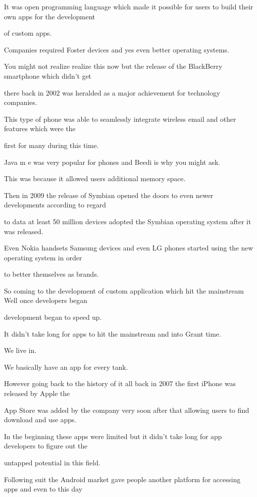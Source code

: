 It was open programming language which made it possible for users to build their own apps for the development

of custom apps.

Companies required Foster devices and yes even better operating systems.

You might not realize realize this now but the release of the BlackBerry smartphone which didn't get

there back in 2002 was heralded as a major achievement for technology companies.

This type of phone was able to seamlessly integrate wireless email and other features which were the

first for many during this time.

Java m e was very popular for phones and Beedi is why you might ask.

This was because it allowed users additional memory space.

Then in 2009 the release of Symbian opened the doors to even newer developments according to regard

to data at least 50 million devices adopted the Symbian operating system after it was released.

Even Nokia handsets Samsung devices and even LG phones started using the new operating system in order

to better themselves as brands.

So coming to the development of custom application which hit the mainstream Well once developers began

development began to speed up.

It didn't take long for apps to hit the mainstream and into Grant time.

We live in.

We basically have an app for every tank.

However going back to the history of it all back in 2007 the first iPhone was released by Apple the

App Store was added by the company very soon after that allowing users to find download and use apps.

In the beginning these apps were limited but it didn't take long for app developers to figure out the

untapped potential in this field.

Following suit the Android market gave people another platform for accessing apps and even to this day

